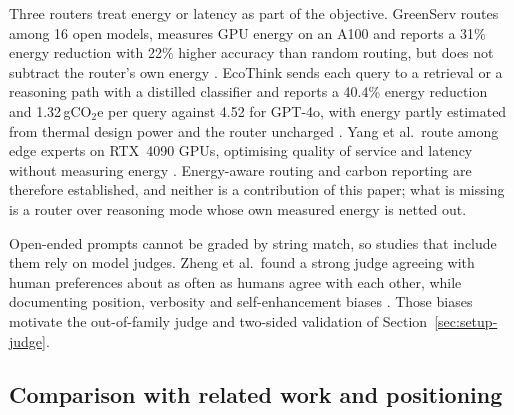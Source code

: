 \documentclass[final,5p,times,twocolumn]{elsarticle}
\theoremstyle{plain}
\begin{document}
Three routers treat energy or latency as part of the objective. GreenServ
routes among 16 open models, measures GPU energy on an A100 and reports a
31\% energy reduction with 22\% higher accuracy than random routing, but does
not subtract the router's own energy \cite{ziller2026greenserv}. EcoThink
sends each query to a retrieval or a reasoning path with a distilled
classifier and reports a 40.4\% energy reduction and 1.32\,gCO$_2$e per query
against 4.52 for GPT-4o, with energy partly estimated from thermal design
power and the router uncharged \cite{li2026ecothink}. Yang et al.\ route
among edge experts on RTX~4090 GPUs, optimising quality of service and
latency without measuring energy \cite{yang2025qosrouting}. Energy-aware
routing and carbon reporting are therefore established, and neither is a
contribution of this paper; what is missing is a router over reasoning mode
whose own measured energy is netted out.

Open-ended prompts cannot be graded by string match, so studies that include
them rely on model judges. Zheng et al.\ found a strong judge agreeing with
human preferences about as often as humans agree with each other, while
documenting position, verbosity and self-enhancement biases
\cite{zheng2023judging}. Those biases motivate the out-of-family judge and
two-sided validation of Section~\ref{sec:setup-judge}.

\subsection{Comparison with related work and positioning}
\label{sec:related-gap}
\end{document}
